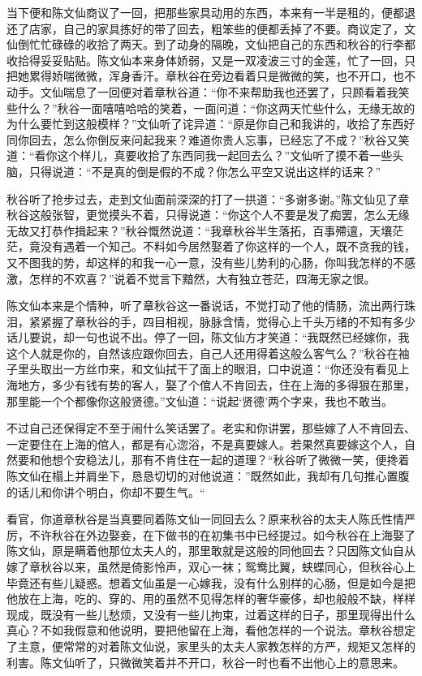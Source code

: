 \documentclass[12pt,UTF8]{ctexbook}
\begin{document}
{{{当下便和陈文仙商议了一回，把那些家具动用的东西，本来有一半是租的，便都退还了店家，自己的家具拣好的带了回去，粗笨些的便都丢掉了不要。商议定了，文仙倒忙忙碌碌的收拾了两天。到了动身的隔晚，文仙把自己的东西和秋谷的行李都收拾得妥妥贴贴。陈文仙本来身体娇弱，又是一双凌波三寸的金莲，忙了一回，只把她累得娇喘微微，浑身香汗。章秋谷在旁边看着只是微微的笑，也不开口，也不动手。文仙喘息了一回便对着章秋谷道：“你不来帮助我也还罢了，只顾看着我笑些什么？”秋谷一面嘻嘻哈哈的笑着，一面问道：“你这两天忙些什么，无缘无故的为什么要忙到这般模样？”文仙听了诧异道：“原是你自己和我讲的，收拾了东西好同你回去，怎么你倒反来问起我来？难道你贵人忘事，已经忘了不成？”秋谷又笑道：“看你这个样儿，真要收拾了东西同我一起回去么？”文仙听了摸不着一些头脑，只得说道：“不是真的倒是假的不成？你怎么平空又说出这样的话来？”

秋谷听了抢步过去，走到文仙面前深深的打了一拱道：“多谢多谢。”陈文仙见了章秋谷这般张智，更觉摸头不着，只得说道：“你这个人不要是发了痴罢，怎么无缘无故又打恭作揖起来？”秋谷慨然说道：“我章秋谷半生落拓，百事殢邅，天壤茫茫，竟没有遇着一个知己。不料如今居然娶着了你这样的一个人，既不贪我的钱，又不图我的势，却这样的和我一心一意，没有些儿势利的心肠，你叫我怎样的不感激，怎样的不欢喜？”说着不觉言下黯然，大有独立苍茫，四海无家之恨。

陈文仙本来是个情种，听了章秋谷这一番说话，不觉打动了他的情肠，流出两行珠泪，紧紧握了章秋谷的手，四目相视，脉脉含情，觉得心上千头万绪的不知有多少话儿要说，却一句也说不出。停了一回，陈文仙方才笑道：“我既然已经嫁你，我这个人就是你的，自然该应跟你回去，自己人还用得着这般么客气么？”秋谷在袖子里头取出一方丝巾来，和文仙拭干了面上的眼泪，口中说道：“你还没有看见上海地方，多少有钱有势的客人，娶了个倌人不肯回去，住在上海的多得狠在那里，那里能一个个都像你这般贤德。”文仙道：“说起‘贤德’两个字来，我也不敢当。

不过自己还保得定不至于闹什么笑话罢了。老实和你讲罢，那些嫁了人不肯回去、一定要住在上海的倌人，都是有心淴浴，不是真要嫁人。若果然真要嫁这个人，自然要和他想个安稳法儿，那有不肯住在一起的道理？“秋谷听了微微一笑，便搀着陈文仙在榻上并肩坐下，恳恳切切的对他说道：”既然如此，我却有几句推心置腹的话儿和你讲个明白，你却不要生气。“

看官，你道章秋谷是当真要同着陈文仙一同回去么？原来秋谷的太夫人陈氏性情严厉，不许秋谷在外边娶妾，在下做书的在初集书中已经提过。如今秋谷在上海娶了陈文仙，原是瞒着他那位太夫人的，那里敢就是这般的同他回去？只因陈文仙自从嫁了章秋谷以来，虽然是倚影怜声，双心一袜；鸳鸯比翼，蛱蝶同心，但秋谷心上毕竟还有些儿疑惑。想着文仙虽是一心嫁我，没有什么别样的心肠，但是如今是把他放在上海，吃的、穿的、用的虽然不见得怎样的奢华豪侈，却也般般不缺，样样现成，既没有一些儿愁烦，又没有一些儿拘束，过着这样的日子，那里现得出什么真心？不如我假意和他说明，要把他留在上海，看他怎样的一个说法。章秋谷想定了主意，便常常的对着陈文仙说，家里头的太夫人家教怎样的方严，规矩又怎样的利害。陈文仙听了，只微微笑着并不开口，秋谷一时也看不出他心上的意思来。

}}}
\end{document}
